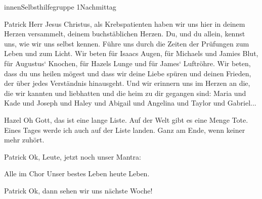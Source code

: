 \documentclass[12pt]{article}
\begin{document}
\begin{scene}[cut to]{innen}{Selbsthilfegruppe 1}{Nachmittag}
        \begin{dialog}[betend]{Patrick}
            Herr Jesus Christus, als Krebspatienten haben wir uns hier in deinem Herzen versammelt, deinem buchstäblichen Herzen.
            Du, und du allein, kennst uns, wie wir uns selbst kennen.
            Führe uns durch die Zeiten der Prüfungen zum Leben und zum Licht.
            Wir beten für Isaacs Augen, für Michaels und Jamies Blut, für Augustus‘ Knochen, für Hazels Lunge und für James‘ Luftröhre.
            Wir beten, dass du uns heilen mögest und dass wir deine Liebe spüren und deinen Frieden, der über jedes Verständnis hinausgeht.
            Und wir erinnern uns im Herzen an die, die wir kannten und liebhatten und die heim zu dir gegangen sind: Maria und Kade und Joseph und Haley und Abigail und Angelina und Taylor und Gabriel...
        \end{dialog}

        \begin{dialog}[In Gedanken]{Hazel}
            Oh Gott, das ist eine lange Liste.
            Auf der Welt gibt es eine Menge Tote.
            Eines Tages werde ich auch auf der Liste landen.
            Ganz am Ende, wenn keiner mehr zuhört.
        \end{dialog}

        \begin{dialog}{Patrick}
            Ok, Leute, jetzt noch unser Mantra:
        \end{dialog}

        \begin{dialog}{Alle im Chor}
            Unser bestes Leben heute Leben.
        \end{dialog}

        \begin{dialog}{Patrick}
            Ok, dann sehen wir uns nächste Woche!
        \end{dialog}

    \end{scene}
\end{document}
